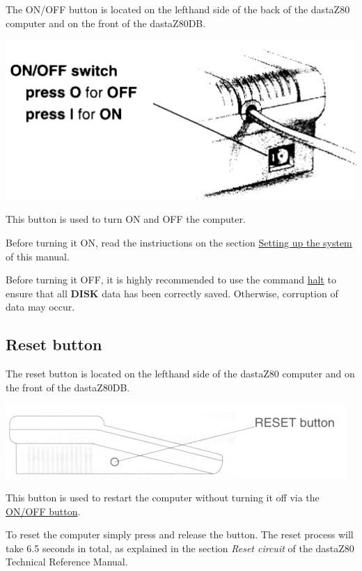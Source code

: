     The ON/OFF button is located on the lefthand side of the back of the
    dastaZ80 computer and on the front of the dastaZ80DB.

    \includegraphics[scale=0.5]{images/onoffbutton.png}

    This button is used to turn ON and OFF the computer.

    Before turning it ON, read the instriuctions on the section
    \hyperref[sec:setting_system]{Setting up the system} of this manual.

    Before turning it OFF, it is highly recommended to use the command 
    \hyperref[cmd:halt]{halt} to ensure that all \textbf{DISK} data has been
    correctly saved. Otherwise, corruption of data may occur.

    \subsection{Reset button}
    \label{subsec:resetbutton}

    The reset button is located on the lefthand side of the dastaZ80 computer
    and on the front of the dastaZ80DB.

    \includegraphics[scale=0.7]{images/resetbutton.png}

    This button is used to restart the computer without turning it off via the
    \hyperref[subsec:onoffbutt]{ON/OFF button}.

    To reset the computer simply press and release the button. The reset process
    will take 6.5 seconds in total, as explained in the section
    \textit{Reset circuit} of the dastaZ80 Technical Reference
    Manual\cite{dastaz80techman}.


